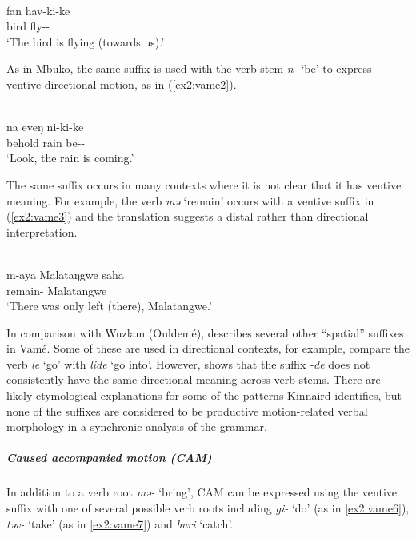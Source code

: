 \ea\label{ex2:vame1}
 \\
\gll  fan hav-ki-ke	\\
bird fly--	\\
\glt `The bird is flying (towards us).'
\z 

As in Mbuko, the same suffix is used with the verb stem \textit{n-} `be' to express ventive directional motion, as in (\ref{ex2:vame2}).

\ea\label{ex2:vame2}
 \\
\gll  na eveŋ ni-ki-ke	\\
behold rain be--	\\
\glt `Look, the rain is coming.'
\z 

The same suffix occurs in many contexts where it is not clear that it has ventive meaning. For example, the verb \textit{mə} `remain' occurs with a ventive suffix in (\ref{ex2:vame3}) and the translation suggests a distal rather than directional interpretation.

\ea\label{ex2:vame3}
 \\
\gll m-aya Malataŋgwe saha	\\
remain- Malatangwe 	\\
\glt `There was only left (there), Malatangwe.'
\z

In comparison with Wuzlam (Ouldemé), \citet[48]{kinnairdVameVerbalSystem2006} describes several other ``spatial'' suffixes in Vamé. Some of these are used in directional contexts, for example, compare the verb \textit{le} `go' with \textit{lide} `go into'. However, \citet[50]{kinnairdVameVerbalSystem2006} shows that the suffix \textit{-de} does not consistently have the same directional meaning across verb stems. There are likely etymological explanations for some of the patterns Kinnaird identifies, but none of the suffixes are considered to be productive motion-related verbal morphology in a synchronic analysis of the grammar. 

\subparagraph{Caused accompanied motion (CAM)}

In addition to a verb root \textit{mə-} `bring', CAM can be expressed using the ventive suffix with one of several possible verb roots including \textit{gi-} `do' (as in \ref{ex2:vame6}),  \textit{təv-} `take' (as in \ref{ex2:vame7}) and \textit{buri} `catch'.

